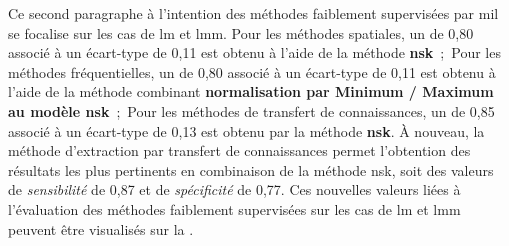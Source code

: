 Ce second paragraphe à l'intention des méthodes faiblement supervisées par \gls{mil} se focalise sur les cas de \gls{lm} et \gls{lmm}. Pour les méthodes spatiales, un \fscore{} de 0,80 associé à un écart-type de 0,11 est obtenu à l'aide de la méthode \textbf{\gls{nsk}}~;~Pour les méthodes fréquentielles, un \fscore{} de 0,80 associé à un écart-type de 0,11 est obtenu à l'aide de la méthode combinant \textbf{normalisation par Minimum / Maximum au modèle \gls{nsk}}~;~Pour les méthodes de transfert de connaissances, un \fscore{} de 0,85 associé à un écart-type de 0,13 est obtenu par la méthode \textbf{\gls{nsk}}. À nouveau, la méthode d'extraction par transfert de connaissances permet l'obtention des résultats les plus pertinents en combinaison de la méthode \gls{nsk}, soit des valeurs de \textit{sensibilité} de 0,87 et de \textit{spécificité} de 0,77. Ces nouvelles valeurs liées à l'évaluation des méthodes faiblement supervisées sur les cas de \gls{lm} et \gls{lmm} peuvent être visualisés sur la .\par

